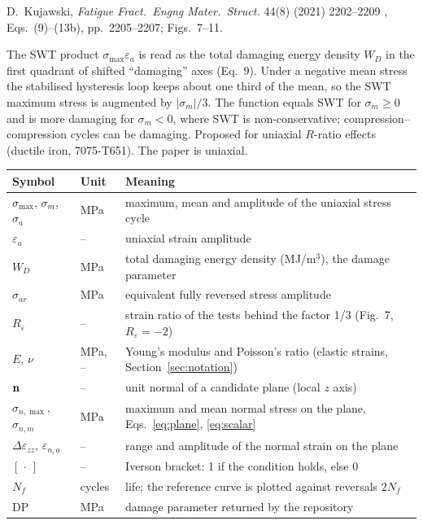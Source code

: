 \label{sheet:KUJAWSKI2021}

 D.~Kujawski, \emph{Fatigue Fract.\ Engng Mater.\ Struct.} 44(8) (2021) 2202--2209
\cite{kujawski2021}, Eqs.~(9)--(13b), pp.~2205--2207; Figs.~7--11.

 The SWT product $\sigma_{\max}\varepsilon_a$ is read as the total damaging
energy density $W_D$ in the first quadrant of shifted ``damaging'' axes (Eq.~9). Under a negative
mean stress the stabilised hysteresis loop keeps about one third of the mean, so the SWT maximum
stress is augmented by $\lvert\sigma_m\rvert/3$. The function equals SWT for $\sigma_m\ge0$ and is
more damaging for $\sigma_m<0$, where SWT is non-conservative; compression--compression cycles can
be damaging. Proposed for uniaxial $R$-ratio effects (ductile iron, 7075-T651). The paper is
uniaxial.

\begin{center}\small
\begin{tabular}{@{}llp{100mm}@{}}
\toprule
Symbol & Unit & Meaning\\\midrule
$\sigma_{\max}$, $\sigma_m$, $\sigma_a$ & MPa & maximum, mean and amplitude of the uniaxial stress cycle\\
$\varepsilon_a$ & -- & uniaxial strain amplitude\\
$W_D$ & MPa & total damaging energy density (MJ/m$^3$), the damage parameter\\
$\sigma_{ar}$ & MPa & equivalent fully reversed stress amplitude\\
$R_\varepsilon$ & -- & strain ratio of the tests behind the factor 1/3 (Fig.~7, $R_\varepsilon=-2$)\\
$E$, $\nu$ & MPa, -- & Young's modulus and Poisson's ratio (elastic strains, Section~\ref{sec:notation})\\
$\mathbf n$ & -- & unit normal of a candidate plane (local $z$ axis)\\
$\sigma_{n,\max}$, $\sigma_{n,m}$ & MPa & maximum and mean normal stress on the plane, Eqs.~\eqref{eq:plane}, \eqref{eq:scalar}\\
$\Delta\varepsilon_{zz}$, $\varepsilon_{n,a}$ & -- & range and amplitude of the normal strain on the plane\\
$[\,\cdot\,]$ & -- & Iverson bracket: 1 if the condition holds, else 0\\
$N_f$ & cycles & life; the reference curve is plotted against reversals $2N_f$\\
$\mathrm{DP}$ & MPa & damage parameter returned by the repository\\
\bottomrule
\end{tabular}
\end{center}

